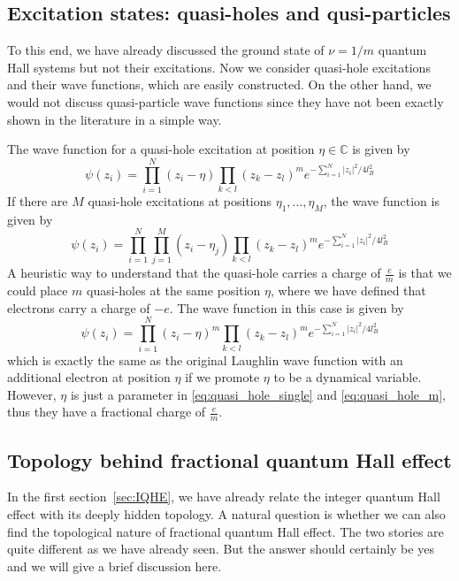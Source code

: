 \documentclass[12pt,a4paper]{article}
\numberwithin{equation}{section}
\begin{document}
\subsection{Excitation states: quasi-holes and qusi-particles}
To this end, we have already discussed the ground state of $\nu=1/m$ quantum Hall systems but not their excitations.
Now we consider quasi-hole excitations and their wave functions, which are easily constructed. On the other hand, we would not discuss quasi-particle wave functions since they have not been exactly shown in the literature in a simple way.

The wave function for a quasi-hole excitation at position $\eta \in \mathbb{C}$ is given by
\begin{equation}
    \label{eq:quasi_hole_single}
    \psi(z_i) = \prod_{i=1}^N (z_i-\eta) \prod_{k<l}(z_k-z_l)^m e^{-\sum_{i=1}^N |z_i|^2/4l_B^2}
\end{equation}
If there are $M$ quasi-hole excitations at positions $\eta_1,\ldots,\eta_M$, the wave function is given by
\begin{equation}
    \label{eq:quasi_hole_m}
    \psi(z_i) = \prod_{i=1}^N \prod_{j=1}^M (z_i-\eta_j) \prod_{k<l}(z_k-z_l)^m e^{-\sum_{i=1}^N |z_i|^2/4l_B^2}
\end{equation}
A heuristic way to understand that the quasi-hole carries a charge of $\frac{e}{m}$ is that we could place $m$ quasi-holes at the same position $\eta$, where we have defined that electrons carry a charge of $-e$.
The wave function in this case is given by
\begin{equation}
    \psi(z_i) = \prod_{i=1}^N (z_i-\eta)^m \prod_{k<l}(z_k-z_l)^m e^{-\sum_{i=1}^N |z_i|^2/4l_B^2}
\end{equation}
which is exactly the same as the original Laughlin wave function with an additional electron at position $\eta$ if we promote $\eta$ to be a dynamical variable. However, $\eta$ is just a parameter in \eqref{eq:quasi_hole_single} and \eqref{eq:quasi_hole_m}, 
thus they have a fractional charge of $\frac{e}{m}$.


\subsection{Topology behind fractional quantum Hall effect}
In the first section~\ref{sec:IQHE}, we have already relate the integer quantum Hall effect with its deeply hidden topology. A natural question is whether we can also find the topological nature of fractional quantum Hall effect.
The two stories are quite different as we have already seen. But the answer should certainly be yes and we will give a brief discussion here.
\end{document}
